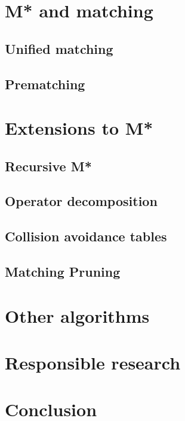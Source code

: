 \documentclass[english]{article}
\begin{document}
\begin{multicols}{2}
\section{M* and matching}

\subsection{Unified matching}
\subsection{Prematching}

\section{Extensions to M*}

\subsection{Recursive M*}
\subsection{Operator decomposition}
\subsection{Collision avoidance tables}
\subsection{Matching Pruning}

\section{Other algorithms}

\section{Responsible research}

\section{Conclusion}

\end{multicols}

\medskip
\printbibliography
\end{document}
